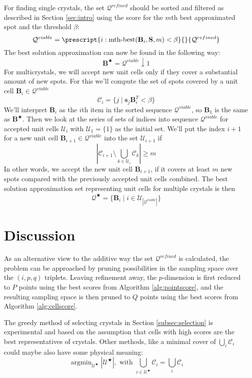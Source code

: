 \documentclass[a4paper,10pt]{article}
\DeclareMathOperator*{\argmin}{argmin}
\newcommand{\vect}[1]{\mathbf{#1}}
\newcommand{\mat}[1]{\mathbf{#1}}
\begin{document}
For finding single crystals, the set $\mathcal{Q}^{refined}$ should be sorted and filtered as described in Section \ref{sec:intro} using the score for the $m$th best approximated spot and the threshold $\beta$:
%
\[
\mathcal{Q}^{viable} = \prescript{i:\text{mth-best}(\mat{B}_i,\mat{S},m)<\beta}{}{\mathcal{Q}^{refined}}
\]
%
The best solution approximation can now be found in the following way:
%
\[
 \mat{B}^\bigstar = \mathcal{Q}^{viable}\downarrow 1
\]
%
For multicrystals, we will accept new unit cells only if they cover a substantial amount of new spots. For this we'll compute the set of spots covered by a unit cell $\mat{B}_i\in\mathcal{Q}^{viable}$
%
\[
 \mathcal{C}_i = \{ j \mid \vect{s}_j\mat{B}_i^T < \beta \}
\]
%
We'll interpret $\mat{B}_i$ as the $i$th item in the sorted sequence $\mathcal{Q}^{viable}$, so $\mat{B}_1$ is the same as $\mat{B}^\bigstar$. Then we look at the series of sets of indices into sequence $\mathcal{Q}^{viable}$ for accepted unit cells $\mathcal{U}_i$ with $\mathcal{U}_1 = \{ 1 \}$ as the initial set. We'll put the index $i+1$ for a new unit cell $\mat{B}_{i+1} \in \mathcal{Q}^{viable}$ into the set $\mathcal{U}_{i+1}$ if
%
\[
 \left| \mathcal{C}_{i+1} \setminus \bigcup_{k \in \mathcal{U}_i} \mathcal{C}_k \right| \geq m
\]
%
In other words, we accept the new unit cell $\mat{B}_{i+1}$, if it covers at least $m$ new spots compared with the previously accepted unit cells combined. The best solution approximation set representing unit cells for multiple crystals is then
%
\[
\mathcal{Q}^\bigstar = \{ \mat{B}_i \mid  i \in \mathcal{U}_{|\mathcal{Q}^{viable}|} \}
\]

\section{Discussion}

As an alternative view to the additive way the set $\mathcal{Q}^{refined}$ is calculated, the problem can be approached by pruning possibilities in the sampling space over the $(i,p,q)$ triplets. Leaving refinement away, the $p$-dimension is first reduced to $P$ points using the best scores from Algorithm \ref{alg:pointscore}, and the resulting sampling space is then pruned to $Q$ points using the best scores from Algorithm \ref{alg:cellscore}.

The greedy method of selecting crystals in Section \ref{subsec:selection} is experimental and based on the assumption that cells with high scores are the best representatives of crystals. Other methods, like a minimal cover of $\bigcup_i \mathcal{C}_i$ could maybe also have some physical meaning:
%
\[
 \argmin_{\mathcal{U}^\bigstar} |\mathcal{U}^\bigstar|, \text{ with }\bigcup_{i\in \mathcal{U}^\bigstar} \mathcal{C}_i = \bigcup_i \mathcal{C}_i
\]
\end{document}
